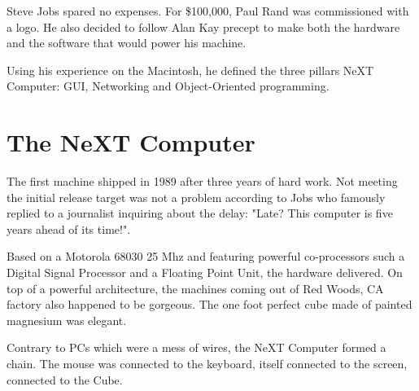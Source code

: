 Steve Jobs spared no expenses. For \$100,000, Paul Rand was commissioned with a logo. He also decided to follow Alan Kay precept to make both the hardware and the software that would power his machine.\\
\par
{}
\par
Using his experience on the Macintosh, he defined the three pillars NeXT Computer: GUI, Networking and Object-Oriented programming.\\
\par
{}

\par
\section{The NeXT Computer}
The first machine shipped in 1989 after three years of hard work. Not meeting the initial release target was not a problem according to Jobs who famously replied to a journalist inquiring about the delay: "Late? This computer is five years ahead of its time!".\\
\par
Based on a Motorola 68030 25 Mhz and featuring powerful co-processors such a Digital Signal Processor and a Floating Point Unit, the hardware delivered. On top of a powerful architecture, the machines coming out of Red Woods, CA factory also happened to be gorgeous. The one foot perfect cube made of painted magnesium was elegant.\\
\par
{}
\par
Contrary to PCs which were a mess of wires, the NeXT Computer formed a chain. The mouse was connected to the keyboard, itself connected to the screen, connected to the Cube.\\
\par

